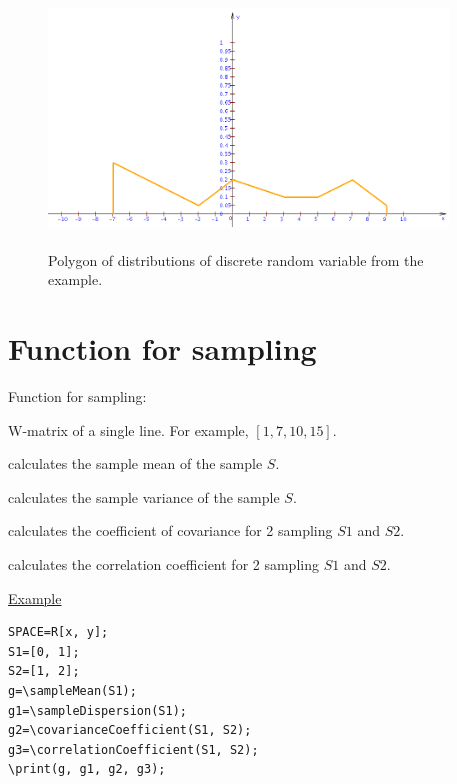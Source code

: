 \begin{figure}[!ht]
 \includegraphics[width=300.57pt, height=192.835pt]{pictures/8_1}
\caption{Polygon of distributions of discrete random variable from the example.
}
\label{8_1}
\end{figure}

\section{Function for sampling}

Function for sampling:

W-matrix of a single line. For example,  $[1, 7, 10, 15]$. 

 calculates the sample mean of the sample $S$. 

 calculates the sample variance of the sample $S$. 

 calculates the coefficient of covariance for 2 sampling $S1$ and $S2$. 

 calculates the correlation coefficient for 2 sampling $S1$ and $S2$. 

\underline{Example}

\vspace*{-2mm}
\begin{verbatim}
SPACE=R[x, y];
S1=[0, 1]; 
S2=[1, 2];
g=\sampleMean(S1); 
g1=\sampleDispersion(S1); 
g2=\covarianceCoefficient(S1, S2); 
g3=\correlationCoefficient(S1, S2); 
\print(g, g1, g2, g3);
\end{verbatim} 

